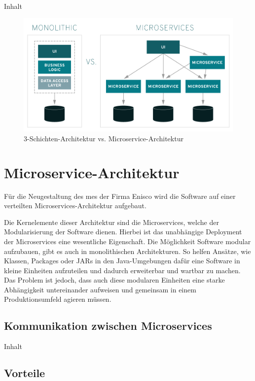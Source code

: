Inhalt

\begin{figure}[H]
    \centering
    \includegraphics[width=0.7\linewidth]{images/monolithic-vs-microservices.png}
    \caption{3-Schichten-Architektur vs. Microservice-Architektur \cite{RedHatLimited.2021}}
    \label{fig:mono_vs_micro}
\end{figure}

\section{Microservice-Architektur\label{sec2.2:Unterpunkt-2}}

Für die Neugestaltung des \gls{mes} der Firma Enisco wird die Software auf einer verteilten Microservices-Architektur aufgebaut.

Die Kernelemente dieser Architektur sind die Microservices, welche der Modularisierung der Software dienen. Hierbei ist das unabhängige Deployment der Microservices eine wesentliche Eigenschaft. Die Möglichkeit Software modular aufzubauen, gibt es auch in monolithischen Architekturen. So helfen Ansätze, wie Klassen, Packages oder JARs in den Java-Umgebungen dafür eine Software in kleine Einheiten aufzuteilen und dadurch erweiterbar und wartbar zu machen. Das Problem ist jedoch, dass auch diese modularen Einheiten eine starke Abhängigkeit untereinander aufweisen und gemeinsam in einem Produktionsumfeld agieren müssen.

\subsection{Kommunikation zwischen Microservices\label{subsec2.2.1:Unterunterpunkt-1}}

Inhalt

\subsection{Vorteile\label{subsec2.2.2:Unterunterpunkt-2}}

